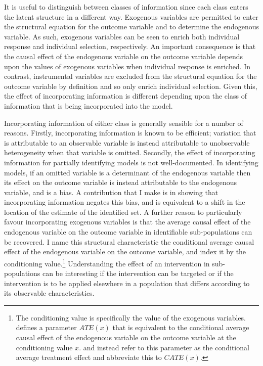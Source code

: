 \documentclass[12pt,a4paper,twoside]{article}
\numberwithin{equation}{section}
\begin{document}
It is useful to distinguish between classes of information since each class enters the latent structure in a different way. Exogenous variables are permitted to enter the structural equation for the outcome variable and to determine the endogenous variable. As such, exogenous variables can be seen to enrich both individual response and individual selection, respectively. An important consequence is that the causal effect of the endogenous variable on the outcome variable depends upon the values of exogenous variables when individual response is enriched. In contrast, instrumental variables are excluded from the structural equation for the outcome variable by definition and so only enrich individual selection. Given this, the effect of incorporating information is different depending upon the class of information that is being incorporated into the model.  

Incorporating information of either class is generally sensible for a number of reasons. Firstly, incorporating information is known to be efficient; variation that is attributable to an observable variable is instead attributable to unobservable heterogeneity when that variable is omitted. Secondly, the effect of incorporating information for partially identifying models is not well-documented. In identifying models, if an omitted variable is a determinant of the endogenous variable then its effect on the outcome variable is instead attributable to the endogenous variable, and is a bias. A contribution that I make is in showing that incorporating information negates this bias, and is equivalent to a shift in the location of the estimate of the identified set. A further reason to particularly favour incorporating exogenous variables is that the average causal effect of the endogenous variable on the outcome variable in identifiable sub-populations can be recovered. I name this structural characteristic the conditional average causal effect of the endogenous variable on the outcome variable, and index it by the conditioning value.\footnote{The conditioning value is specifically the value of the exogenous variables. \cite{hEvY05} defines a parameter $ATE(x)$ that is equivalent to the conditional average causal effect of the endogenous variable on the outcome variable at the conditioning value $x$. \cite{kHt10} and \cite{13.misc.abrevaya} instead refer to this parameter as the conditional average treatment effect and abbreviate this to $CATE(x)$.} Understanding the effect of an intervention in sub-populations can be interesting if the intervention can be targeted or if the intervention is to be applied elsewhere in a population that differs according to its observable characteristics. 
\end{document}
